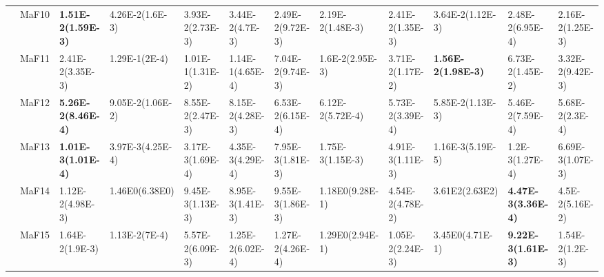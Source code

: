\documentclass[]{article}
\begin{document}
\begin{landscape}
\begin{table}
\begin{footnotesize}
\begin{tabular}{|l|l|l|l|l|l|l|l|l|l|l|l|}
 & MaF10 & \cellcolor{gray95} {\bf 1.51E-2(1.59E-3)} & 4.26E-2(1.6E-3) & 3.93E-2(2.73E-3) & 3.44E-2(4.7E-3) & 2.49E-2(9.72E-3) & \cellcolor{gray95} 2.19E-2(1.48E-3) & 2.41E-2(1.35E-3) & 3.64E-2(1.12E-3) & 2.48E-2(6.95E-4) & \cellcolor{gray95} 2.16E-2(1.25E-3)\\
 & MaF11 & \cellcolor{gray95} 2.41E-2(3.35E-3) & 1.29E-1(2E-4) & 1.01E-1(1.31E-2) & 1.14E-1(4.65E-4) & 7.04E-2(9.74E-3) & \cellcolor{gray95} 1.6E-2(2.95E-3) & 3.71E-2(1.17E-2) & \cellcolor{gray95} {\bf 1.56E-2(1.98E-3)} & 6.73E-2(1.45E-2) & 3.32E-2(9.42E-3)\\
 & MaF12 & \cellcolor{gray95} {\bf 5.26E-2(8.46E-4)} & 9.05E-2(1.06E-2) & 8.55E-2(2.47E-3) & 8.15E-2(4.28E-3) & 6.53E-2(6.15E-4) & 6.12E-2(5.72E-4) & 5.73E-2(3.39E-4) & 5.85E-2(1.13E-3) & \cellcolor{gray95} 5.46E-2(7.59E-4) & \cellcolor{gray95} 5.68E-2(2.3E-4)\\
 & MaF13 & \cellcolor{gray95} {\bf 1.01E-3(1.01E-4)} & 3.97E-3(4.25E-4) & 3.17E-3(1.69E-4) & 4.35E-3(4.29E-4) & 7.95E-3(1.81E-3) & 1.75E-3(1.15E-3) & 4.91E-3(1.11E-3) & \cellcolor{gray95} 1.16E-3(5.19E-5) & \cellcolor{gray95} 1.2E-3(1.27E-4) & 6.69E-3(1.07E-3)\\
 & MaF14 & 1.12E-2(4.98E-3) & 1.46E0(6.38E0) & 9.45E-3(1.13E-3) & \cellcolor{gray95} 8.95E-3(1.41E-3) & \cellcolor{gray95} 9.55E-3(1.86E-3) & 1.18E0(9.28E-1) & 4.54E-2(4.78E-2) & 3.61E2(2.63E2) & \cellcolor{gray95} {\bf 4.47E-3(3.36E-4)} & 4.5E-2(5.16E-2)\\
 & MaF15 & 1.64E-2(1.9E-3) & \cellcolor{gray95} 1.13E-2(7E-4) & 5.57E-2(6.09E-3) & \cellcolor{gray95} 1.25E-2(6.02E-4) & 1.27E-2(4.26E-4) & 1.29E0(2.94E-1) & \cellcolor{gray95} 1.05E-2(2.24E-3) & 3.45E0(4.71E-1) & \cellcolor{gray95} {\bf 9.22E-3(1.61E-3)} & 1.54E-2(1.2E-3)\\
\hline


\end{tabular}
\end{footnotesize}
\end{table}
\end{landscape}
\end{document}
